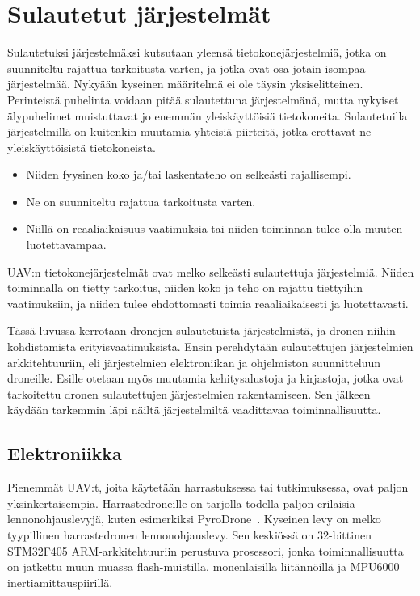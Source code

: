 \chapter{Sulautetut järjestelmät}
\label{ch:sulautetut}

Sulautetuksi järjestelmäksi kutsutaan yleensä tietokonejärjestelmiä, jotka on
suunniteltu rajattua tarkoitusta varten, ja jotka ovat osa jotain isompaa
järjestelmää. Nykyään kyseinen määritelmä ei ole täysin yksiselitteinen.
Perinteistä puhelinta voidaan pitää sulautettuna järjestelmänä, mutta nykyiset
älypuhelimet muistuttavat jo enemmän yleiskäyttöisiä tietokoneita.
Sulautetuilla järjestelmillä on kuitenkin muutamia yhteisiä piirteitä, jotka
erottavat ne yleiskäyttöisistä tietokoneista.~\cite{Noergaard2005}
\begin{itemize}
  \item Niiden fyysinen koko ja/tai laskentateho on selkeästi rajallisempi.
  \item Ne on suunniteltu rajattua tarkoitusta varten.
  \item Niillä on reaaliaikaisuus-vaatimuksia tai niiden toiminnan tulee olla
    muuten luotettavampaa.
\end{itemize}

UAV:n tietokonejärjestelmät ovat melko selkeästi sulautettuja järjestelmiä.
Niiden toiminnalla on tietty tarkoitus, niiden koko ja teho on rajattu
tiettyihin vaatimuksiin, ja niiden tulee ehdottomasti toimia reaaliaikaisesti
ja luotettavasti.

Tässä luvussa kerrotaan dronejen sulautetuista järjestelmistä, ja dronen niihin
kohdistamista erityisvaatimuksista. Ensin perehdytään sulautettujen
järjestelmien arkkitehtuuriin, eli järjestelmien elektroniikan ja ohjelmiston
suunnitteluun droneille. Esille otetaan myös muutamia kehitysalustoja ja
kirjastoja, jotka ovat tarkoitettu dronen sulautettujen järjestelmien
rakentamiseen. Sen jälkeen käydään tarkemmin läpi näiltä järjestelmiltä
vaadittavaa toiminnallisuutta.

\section{Elektroniikka}
Pienemmät UAV:t, joita käytetään harrastuksessa tai tutkimuksessa, ovat paljon
yksinkertaisempia. Harrastedroneille on tarjolla todella paljon erilaisia
lennonohjauslevyjä, kuten esimerkiksi PyroDrone~\cite{PyroDroneFC}. Kyseinen
levy on melko tyypillinen harrastedronen lennonohjauslevy. Sen keskiössä on
32-bittinen STM32F405 ARM-arkkitehtuuriin perustuva prosessori, jonka
toiminnallisuutta on jatkettu muun muassa flash-muistilla, monenlaisilla
liitännöillä ja MPU6000 inertiamittauspiirillä.

